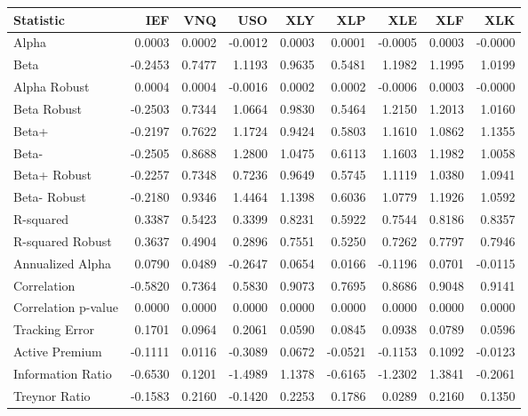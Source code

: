 \begin{tabular}{lrrrrrrrr}
\toprule
Statistic & IEF & VNQ & USO & XLY & XLP & XLE & XLF & XLK \\
\midrule
Alpha & 0.0003 & 0.0002 & -0.0012 & 0.0003 & 0.0001 & -0.0005 & 0.0003 & -0.0000 \\
Beta & -0.2453 & 0.7477 & 1.1193 & 0.9635 & 0.5481 & 1.1982 & 1.1995 & 1.0199 \\
Alpha Robust & 0.0004 & 0.0004 & -0.0016 & 0.0002 & 0.0002 & -0.0006 & 0.0003 & -0.0000 \\
Beta Robust & -0.2503 & 0.7344 & 1.0664 & 0.9830 & 0.5464 & 1.2150 & 1.2013 & 1.0160 \\
Beta+ & -0.2197 & 0.7622 & 1.1724 & 0.9424 & 0.5803 & 1.1610 & 1.0862 & 1.1355 \\
Beta- & -0.2505 & 0.8688 & 1.2800 & 1.0475 & 0.6113 & 1.1603 & 1.1982 & 1.0058 \\
Beta+ Robust & -0.2257 & 0.7348 & 0.7236 & 0.9649 & 0.5745 & 1.1119 & 1.0380 & 1.0941 \\
Beta- Robust & -0.2180 & 0.9346 & 1.4464 & 1.1398 & 0.6036 & 1.0779 & 1.1926 & 1.0592 \\
R-squared & 0.3387 & 0.5423 & 0.3399 & 0.8231 & 0.5922 & 0.7544 & 0.8186 & 0.8357 \\
R-squared Robust & 0.3637 & 0.4904 & 0.2896 & 0.7551 & 0.5250 & 0.7262 & 0.7797 & 0.7946 \\
Annualized Alpha & 0.0790 & 0.0489 & -0.2647 & 0.0654 & 0.0166 & -0.1196 & 0.0701 & -0.0115 \\
Correlation & -0.5820 & 0.7364 & 0.5830 & 0.9073 & 0.7695 & 0.8686 & 0.9048 & 0.9141 \\
Correlation p-value & 0.0000 & 0.0000 & 0.0000 & 0.0000 & 0.0000 & 0.0000 & 0.0000 & 0.0000 \\
Tracking Error & 0.1701 & 0.0964 & 0.2061 & 0.0590 & 0.0845 & 0.0938 & 0.0789 & 0.0596 \\
Active Premium & -0.1111 & 0.0116 & -0.3089 & 0.0672 & -0.0521 & -0.1153 & 0.1092 & -0.0123 \\
Information Ratio & -0.6530 & 0.1201 & -1.4989 & 1.1378 & -0.6165 & -1.2302 & 1.3841 & -0.2061 \\
Treynor Ratio & -0.1583 & 0.2160 & -0.1420 & 0.2253 & 0.1786 & 0.0289 & 0.2160 & 0.1350 \\
\bottomrule
\end{tabular}
